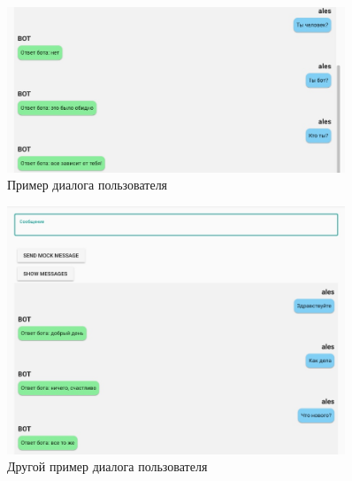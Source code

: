 \begin{figure}[H]
    \centering
    \includegraphics[width=0.9\textwidth]{image/chat.jpg}
    \caption{Пример диалога пользователя}
    \label{fig:chat1}
\end{figure}



\begin{figure}[H]
    \centering
    \includegraphics[width=0.9\textwidth]{image/chat2.jpg}
    \caption{Другой пример диалога пользователя}
    \label{fig:chat2}
\end{figure}